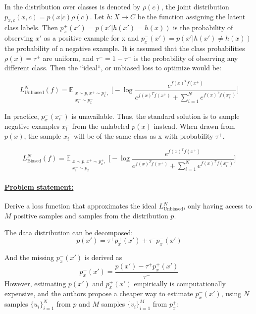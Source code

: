 \documentclass{article}
\begin{document}
In \citep{chuang2021debiased} the distribution over classes is denoted by $\rho(c)$, the joint distribution $p_{x,c}(x, c) = p(x|c)\rho(c)$. Let $h : X \rightarrow C$ be the function assigning the latent class labels. Then $p^+_x(x') = p(x'|h(x') = h(x))$ is the probability of observing $x'$ as a positive example for x and $p^-_x(x') = p(x'|h(x') \neq h(x))$ the probability of a negative example. It is assumed that the class probabilities $\rho(x) = \tau^+$ are uniform, and $\tau^- = 1 - \tau^+$ is the probability of observing any different class. Then the  ``ideal``, or unbiased loss to optimize would be:

\begin{equation}
L_{\text{Unbiased}}^N(f) = \mathbb{E}_{\substack{x \sim p, x^+ \sim p^+_x,\\ x_i^- \sim p_x^-}} \bigg[-\log \frac{e^{f(x)^T f(x^+)}}{e^{f(x)^T f(x^+)} + \sum _{i=1}^N e^{f(x)^T f(x_i^-)}}\bigg]
\end{equation}

In practice, $p_x^-(x_i^-)$ is unavailable.
Thus, the standard solution is to sample negative examples $x_i^-$ from the unlabeled $p(x)$ instead. When drawn from $p(x)$, the sample $x_i^-$ will be of the same class as x with probability $\tau^+$.

\begin{equation}
L_{\text{Biased}}^N(f) = \mathbb{E}_{\substack{x \sim p, x^+ \sim p^+_x,\\ x_i^- \sim p_x}} \bigg[-\log \frac{e^{f(x)^T f(x^+)}}{e^{f(x)^T f(x^+)} + \sum _{i=1}^N e^{f(x)^T f(x_i^-)}}\bigg]
\end{equation}

\paragraph{\underline{Problem statement:}} Derive a loss function that approximates the ideal $L_{\text{Unbiased}}^N$, only having access to $M$ positive samples and samples from the distribution $p$.



The data distribution can be decomposed:
\begin{equation}
p(x') = \tau^+ p^+_x(x') + \tau^-p_x^-(x')
\end{equation}

And the missing $p^-_x(x')$ is derived as
\begin{equation} \label{eq:5}
p_x^-(x') = \frac{p(x') - \tau^+ p^+_x(x')}{\tau^-}
\end{equation}
However, estimating $p(x')$ and $p^+_x(x')$ empirically is computationally expensive, and the authors propose a cheaper way to estimate $p^-_x(x')$, using $N$ samples $\{u_i\}_{i=1}^N$ from $p$ and $M$ samples $\{v_i\}_{i=1}^M$ from $p_x^+$:
\end{document}
